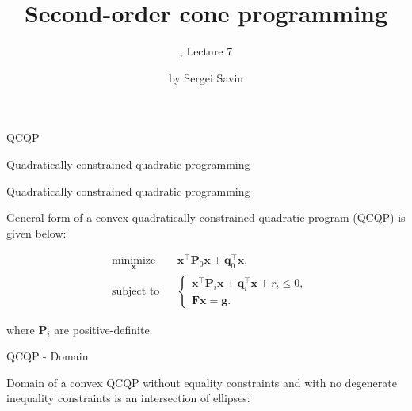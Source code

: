 \documentclass{beamer}
\title{Second-order cone programming}
\subtitle{\mycoursetitle, Lecture 7}
\author{by Sergei Savin}
\date{\mydate}
\begin{document}
\maketitle


%
%


\begin{frame}{QCQP}
	
	{\huge Quadratically constrained quadratic programming}
	
\end{frame}



\begin{frame}{Quadratically constrained quadratic programming}
	\begin{flushleft}
		
		General form of a convex quadratically constrained quadratic program (QCQP) is given below:
		
		\begin{equation}
			\begin{aligned}
				& \underset{\mathbf{x}}{\text{minimize}}
				& & \mathbf{x}^\top \mathbf{P}_0 \mathbf{x} + \mathbf{q}_0^\top\mathbf{x}, \\
				& \text{subject to}
				& & \begin{cases}
					\mathbf{x}^\top \mathbf{P}_i \mathbf{x} + \mathbf{q}_i^\top\mathbf{x} + r_i \leq 0, \\
					\mathbf{F}\mathbf{x} = \mathbf{g}.
				\end{cases}
			\end{aligned}
		\end{equation}
		
		where $\mathbf{P}_i$ are positive-definite.
		
	\end{flushleft}
\end{frame}



\begin{frame}{QCQP - Domain}
	\begin{flushleft}
		
		Domain of a convex QCQP without equality constraints and with no degenerate inequality constraints is an intersection of ellipses:
		
		\begin{figure} [h!]
			\begin{center}
				
			\end{center} 
		\end{figure}
		
	\end{flushleft}
\end{frame}
\end{document}
